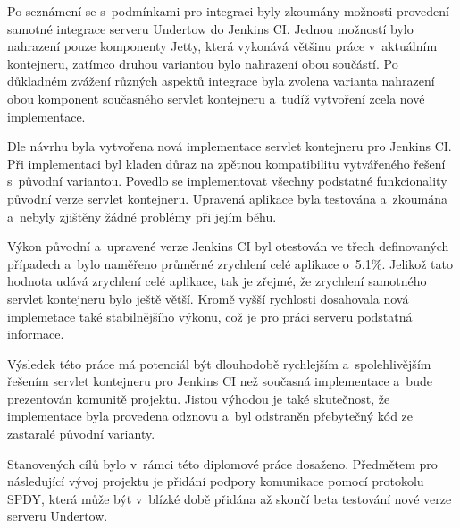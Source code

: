     Po seznámení se s~podmínkami pro integraci byly
    zkoumány možnosti provedení samotné integrace serveru Undertow do Jenkins CI.
    Jednou možností bylo nahrazení pouze komponenty
    Jetty, která vykonává většinu práce v~aktuálním kontejneru, zatímco druhou variantou bylo
    nahrazení obou součástí. 
    Po důkladném zvážení různých aspektů integrace byla 
    zvolena varianta nahrazení obou komponent současného 
    servlet kontejneru a~tudíž vytvoření zcela nové implementace.

    Dle návrhu byla vytvořena nová implementace servlet kontejneru
    pro Jenkins CI. Při implementaci byl kladen důraz na zpětnou kompatibilitu
    vytvářeného řešení s~původní variantou. Povedlo se implementovat všechny podstatné
    funkcionality původní verze servlet kontejneru. Upravená
    aplikace byla testována a~zkoumána a~nebyly zjištěny žádné problémy
    při jejím běhu.

    Výkon původní a~upravené verze Jenkins CI byl otestován ve třech 
    definovaných případech a~bylo naměřeno průměrné zrychlení celé aplikace
    o~5.1\%. 
    Jelikož tato hodnota udává zrychlení celé aplikace, tak je 
    zřejmé, že zrychlení samotného servlet kontejneru bylo ještě větší.
    Kromě vyšší rychlosti dosahovala nová implemetace také stabilnějšího
    výkonu, což je pro práci serveru podstatná informace.
    
    Výsledek této práce má potenciál být dlouhodobě rychlejším
    a~spolehlivějším řešením servlet kontejneru pro Jenkins CI než současná implementace
    a~bude prezentován komunitě projektu.
    Jistou výhodou je také skutečnost, že implementace byla provedena
    odznovu a~byl odstraněn přebytečný kód ze zastaralé původní varianty.
    
    Stanovených cílů bylo v~rámci této diplomové práce dosaženo.
    Předmětem pro následující vývoj projektu je 
    přidání podpory komunikace pomocí protokolu SPDY, 
    která může být v~blízké době přidána až skončí beta testování
    nové verze serveru Undertow.

    







